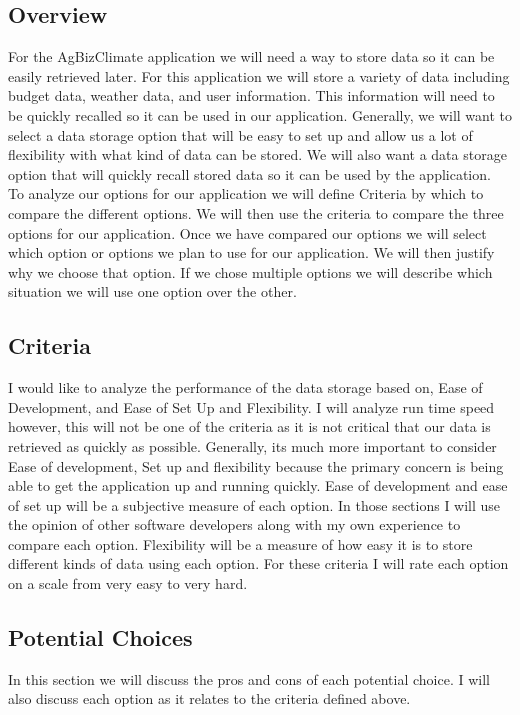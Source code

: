 \documentclass[letterpaper,10pt]{article}
\begin{document}
	\subsection{Overview}
		For the AgBizClimate application we will need a way to store data so it can be easily retrieved later. For this application we will store a variety of data including budget data, weather data, and user information. This information will need to be quickly recalled so it can be used in our application. Generally, we will want to select a data storage option that will be easy to set up and allow us a lot of flexibility with what kind of data can be stored. We will also want a data storage option that will quickly recall stored data so it can be used by the application.\\
		To analyze our options for our application we will define Criteria by which to compare the different options. We will then use the criteria to compare the three options for our application. Once we have compared our options we will select which option or options we plan to use for our application. We will then justify why we choose that option. If we chose multiple options we will describe which situation we will use one option over the other.
	\subsection{Criteria}
		I would like to analyze the performance of the data storage based on, Ease of Development, and Ease of Set Up and Flexibility. I will analyze run time speed however, this will not be one of the criteria as it is not critical that our data is retrieved as quickly as possible. Generally, its much more important to consider Ease of development, Set up and flexibility because the primary concern is being able to get the application up and running quickly. Ease of development and ease of set up will be a subjective measure of each option. In those sections I will use the opinion of other software developers along with my own experience to compare each option. Flexibility will be a measure of how easy it is to store different kinds of data using each option. For these criteria I will rate each option on a scale from very easy to very hard.
	\subsection{Potential Choices}
		In this section we will discuss the pros and cons of each potential choice. I will also discuss each option as it relates to the criteria defined above. 
\end{document}
